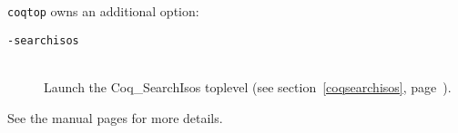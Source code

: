 {\tt coqtop} owns an additional option:

\begin{description}
\item[{\tt -searchisos}]\ \\
  Launch the {\sf Coq\_SearchIsos} toplevel
  (see section~\ref{coqsearchisos}, page~\pageref{coqsearchisos}).
\end{description}

See the manual pages for more details.


